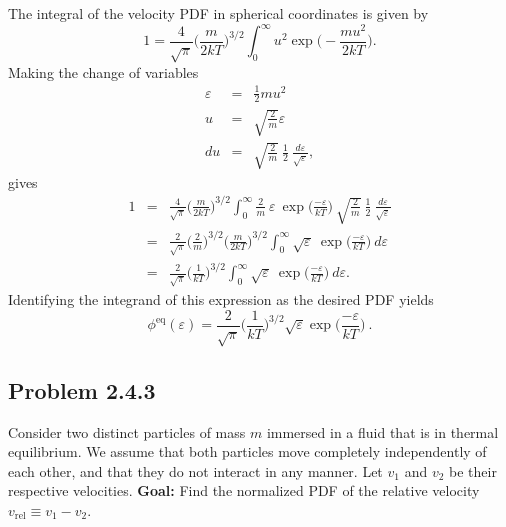The integral of the velocity PDF in spherical coordinates is given by
\begin{equation}
1 = \frac{4}{\sqrt{\pi}} \bigg(\frac{m}{2 k T}\bigg)^{3/2} \int_{0}^{\infty} u^2 \exp\bigg(-\frac{m u^2}{2 k T}\bigg).
\end{equation}
Making the change of variables 
\begin{eqnarray*}
\varepsilon &=& \frac{1}{2} m u ^2 \\
u &=& \sqrt{\frac{2}{m}} \varepsilon \\
du &=& \sqrt{\frac{2}{m}}~\frac{1}{2}~\frac{d \varepsilon}{\sqrt{\varepsilon}},
\end{eqnarray*}
gives
\begin{eqnarray*}
1 &=& \frac{4}{\sqrt{\pi}} \bigg(\frac{m}{2 k T}\bigg)^{3/2} \int_{0}^{\infty} \frac{2}{m}~ \varepsilon~\exp\bigg(\frac{-\varepsilon}{k T}\bigg) ~ \sqrt{\frac{2}{m}}~\frac{1}{2}~\frac{d \varepsilon}{\sqrt{\varepsilon}} \\
&=& \frac{2}{\sqrt{\pi}} \bigg(\frac{2}{m}\bigg)^{3/2} \bigg(\frac{m}{2 k T}\bigg)^{3/2} \int_{0}^{\infty} \sqrt{\varepsilon} ~ \exp\bigg(\frac{-\varepsilon}{k T}\bigg)~d \varepsilon\\
&=& \frac{2}{\sqrt{\pi}} \bigg(\frac{1}{k T}\bigg)^{3/2} \int_{0}^{\infty} \sqrt{\varepsilon}~ \exp\bigg(\frac{-\varepsilon}{k T}\bigg)~d \varepsilon.
\end{eqnarray*}
Identifying the integrand of this expression as the desired PDF yields
\begin{equation}
\boxed{\phi^{\text{eq}}(\varepsilon) = \frac{2}{\sqrt{\pi}} \bigg(\frac{1}{k T}\bigg)^{3/2} \sqrt{\varepsilon} \exp\bigg(\frac{-\varepsilon}{k T}\bigg)}~.
\end{equation}

\subsection{Problem 2.4.3}

Consider two distinct particles of mass $m$ immersed in a fluid that is in thermal equilibrium. We assume that both particles move completely independently of each other, and that they do not interact in any manner. Let $v_1$ and $v_2$ be their respective velocities. \textbf{Goal:} Find the normalized PDF of the relative velocity $v_\text{rel} \equiv v_1-v_2$.


